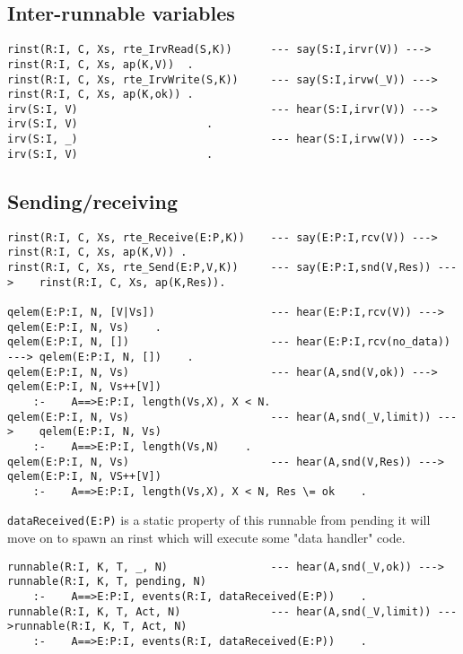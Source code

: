 \subsection{Inter-runnable variables}

\begin{verbatim}
rinst(R:I, C, Xs, rte_IrvRead(S,K))      --- say(S:I,irvr(V)) --->     rinst(R:I, C, Xs, ap(K,V))  .
rinst(R:I, C, Xs, rte_IrvWrite(S,K))     --- say(S:I,irvw(_V)) --->    rinst(R:I, C, Xs, ap(K,ok)) .
irv(S:I, V)                              --- hear(S:I,irvr(V)) --->    irv(S:I, V)                    .
irv(S:I, _)                              --- hear(S:I,irvw(V)) --->    irv(S:I, V)                    .
\end{verbatim}

\subsection{Sending/receiving}

\begin{verbatim}
rinst(R:I, C, Xs, rte_Receive(E:P,K))    --- say(E:P:I,rcv(V)) --->        rinst(R:I, C, Xs, ap(K,V)) .
rinst(R:I, C, Xs, rte_Send(E:P,V,K))     --- say(E:P:I,snd(V,Res)) --->    rinst(R:I, C, Xs, ap(K,Res)).

qelem(E:P:I, N, [V|Vs])                  --- hear(E:P:I,rcv(V)) --->       qelem(E:P:I, N, Vs)    .
qelem(E:P:I, N, [])                      --- hear(E:P:I,rcv(no_data)) ---> qelem(E:P:I, N, [])    .
qelem(E:P:I, N, Vs)                      --- hear(A,snd(V,ok)) --->        qelem(E:P:I, N, Vs++[V])
    :-    A==>E:P:I, length(Vs,X), X < N.
qelem(E:P:I, N, Vs)                      --- hear(A,snd(_V,limit)) --->    qelem(E:P:I, N, Vs)
    :-    A==>E:P:I, length(Vs,N)    .
qelem(E:P:I, N, Vs)                      --- hear(A,snd(V,Res)) --->       qelem(E:P:I, N, VS++[V])
    :-    A==>E:P:I, length(Vs,X), X < N, Res \= ok    .
\end{verbatim}

\verb+dataReceived(E:P)+ is a static property of this runnable
  from pending it will move on to spawn an rinst which will execute some "data handler" code.
\begin{verbatim}
runnable(R:I, K, T, _, N)                --- hear(A,snd(_V,ok)) --->   runnable(R:I, K, T, pending, N)
    :-    A==>E:P:I, events(R:I, dataReceived(E:P))    .
runnable(R:I, K, T, Act, N)              --- hear(A,snd(_V,limit)) --->runnable(R:I, K, T, Act, N)
    :-    A==>E:P:I, events(R:I, dataReceived(E:P))    .
\end{verbatim}

